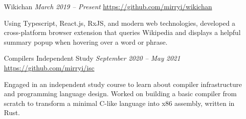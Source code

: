 \documentclass[letterpaper,11pt]{article}
\begin{document}
  \begin{rsectionlist}
    \rsectionitem
      {Wikichan}
      {\small\itshape March 2019 -- Present}
      {\small \url{https://github.com/mirryi/wikichan}}
      {}

      Using Typescript, React.js, RxJS, and modern web technologies, developed a cross-platform
      browser extension that queries Wikipedia and displays a helpful summary popup when hovering
      over a word or phrase.

    \rsectionitem
      {Compilers Independent Study}
      {\small\itshape September 2020 -- May 2021}
      {\small \url{https://github.com/mirryi/isc}}
      {}

      Engaged in an independent study course to learn about compiler infrastructure and programming
      language design. Worked on building a basic compiler from scratch to transform a minimal
      C-like language into x86 assembly, written in Rust.
  \end{rsectionlist}
\end{document}
